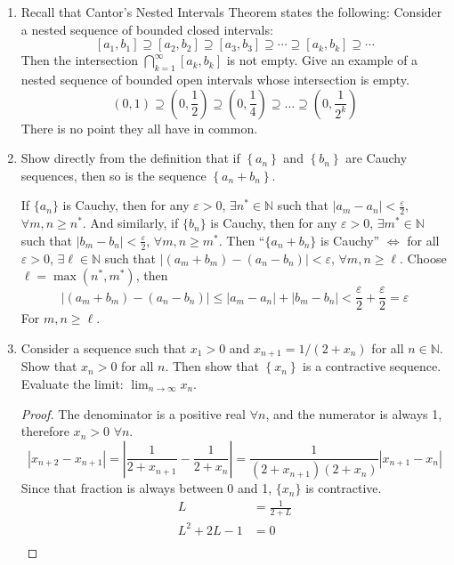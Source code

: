 \documentclass[hidelinks,12pt]{article}
\title{\scalebox{2}{Math 523 Homework 4}}
\author{\scalebox{1.5}{Theo Koss}}
\date{October 2023}
\renewcommand{\geq}{\geqslant}
\renewcommand{\leq}{\leqslant}
\newcommand{\N}{\mathbb{N}}
\renewcommand{\epsilon}{\varepsilon}
\begin{document}
\maketitle
\begin{enumerate}
    \item Recall that Cantor's Nested Intervals Theorem states the following: Consider a nested sequence of bounded closed intervals:
$$
\left[a_1, b_1\right] \supseteq\left[a_2, b_2\right] \supseteq\left[a_3, b_3\right] \supseteq \cdots \supseteq\left[a_k, b_k\right] \supseteq \cdots
$$ Then the intersection $\bigcap_{k=1}^{\infty}\left[a_k, b_k\right]$ is not empty.
Give an example of a nested sequence of bounded open intervals whose intersection is empty. $$\left(0,1\right)\supseteq\left(0,\frac{1}{2}\right)\supseteq\left(0,\frac{1}{4}\right)\supseteq\dots\supseteq\left(0,\frac{1}{2^k}\right)$$ There is no point they all have in common.
    \item Show directly from the definition that if $\left\{a_n\right\}$ and $\left\{b_n\right\}$ are Cauchy sequences, then so is the sequence $\left\{a_n+b_n\right\}$.\par\null\par If $\{a_n\}$ is Cauchy, then for any $\epsilon>0$, $\exists n^*\in\N$ such that $|a_m-a_n|<\frac{\epsilon}{2}$, $\forall m,n\geq n^*$. And similarly, if $\{b_n\}$ is Cauchy, then for any $\epsilon>0$, $\exists m^*\in\N$ such that $|b_m-b_n|<\frac{\epsilon}{2}$, $\forall m,n\geq m^*$. Then ``$\{a_n+b_n\}$ is Cauchy'' $\iff$ for all $\epsilon>0$, $\exists\ell\in\N$ such that $|(a_m+b_m)-(a_n-b_n)|<\epsilon$, $\forall m,n\geq\ell$. Choose $\ell=\max(n^*,m^*)$, then $$|(a_m+b_m)-(a_n-b_n)|\leq|a_m-a_n|+|b_m-b_n|<\frac{\epsilon}{2}+\frac{\epsilon}{2}=\epsilon$$ For $m,n\geq\ell$.
    \item Consider a sequence such that $x_1>0$ and $x_{n+1}=1 /\left(2+x_n\right)$ for all $n \in \mathbb{N}$. Show that $x_n>0$ for all $n$. Then show that $\left\{x_n\right\}$ is a contractive sequence. Evaluate the limit: $\lim _{n \rightarrow \infty} x_n$.\begin{proof}
    The denominator is a positive real $\forall n$, and the numerator is always 1, therefore $x_n>0$ $\forall n$.
        $$|x_{n+2}-x_{n+1}|=\left|\frac{1}{2+x_{n+1}}-\frac{1}{2+x_n}\right|=\frac{1}{(2+x_{n+1})(2+x_n)}|x_{n+1}-x_n|$$ Since that fraction is always between 0 and 1, $\{x_n\}$ is contractive.\begin{align*}
            L&=\frac{1}{2+L}\\
            L^2+2L-1&=0\\

\end{align*}
\end{proof}
\end{enumerate}
\end{document}
